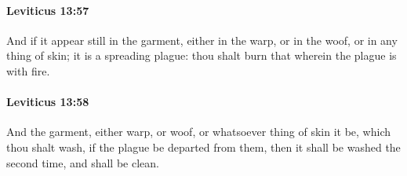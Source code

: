 		\paragraph{Leviticus 13:57} %
			\label{LEVITICUS-13-57}

			And if it appear still in the garment, either in the warp, or in the woof, or in any thing of skin; it is a spreading plague: thou shalt burn that wherein the plague is with fire.


		\paragraph{Leviticus 13:58} %
			\label{LEVITICUS-13-58}

			And the garment, either warp, or woof, or whatsoever thing of skin it be, which thou shalt wash, if the plague be departed from them, then it shall be washed the second time, and shall be clean.

